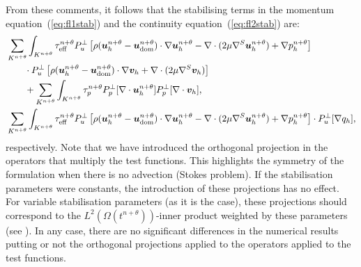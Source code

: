 \documentclass[11pt,a4paper,oneside,reqno]{amsart}
\newcommand{\Eq}[1]{(\ref{eq:#1})}
\def\u{{\bm u}}
\def\cl{\nonumber\\}
\def\vt{\bm v}
\begin{document}
From these comments, it follows that the stabilising terms in the momentum equation~\Eq{fl1stab} and the continuity equation~\Eq{fl2stab}  are:
\begin{align}
& \sum_{K^{n+\theta}}  \int_{K^{n+\theta}} 
 \tau^{n+\theta}_{\rm eff} P_u^\bot \left[
 \rho (\u_h^{n+\theta}-{\u_{\rm dom}^{n+\theta}})\cdot\nabla\u_h^{n+\theta}
- \nabla\cdot (2\mu \nabla^S\u_h^{n+\theta}) + \nabla p_h^{n+\theta}\right]\cl
& \qquad  \cdot P_u^\bot \left[
\rho (\u_h^{n+\theta}-{\u_{\rm dom}^{n+\theta}})\cdot\nabla\vt_h + \nabla\cdot (2\mu \nabla^S\vt_h)\right]\cl
& \qquad +  \sum_{K^{n+\theta}}  \int_{K^{n+\theta}}   \tau_p^{n+\theta} P_p^\bot[ \nabla \cdot \u_h^{n+\theta}] P_p^\bot[ \nabla \cdot \vt_h], \label{eq:stt1}\\
& \sum_{K^{n+\theta}}  \int_{K^{n+\theta}} 
 \tau_{\rm eff}^{n+\theta} P_u^\bot \left[
 \rho (\u_h^{n+\theta}-{\u_{\rm dom}^{n+\theta}})\cdot\nabla\u_h^{n+\theta}
- \nabla\cdot (2\mu \nabla^S\u_h^{n+\theta}) + \nabla p_h^{n+\theta}\right]\cdot P_u^\bot [ \nabla q_h],\label{eq:stt2}
\end{align}
respectively. Note that we have introduced the orthogonal projection in the operators that multiply the test functions. This highlights the symmetry of the formulation when there is no advection (Stokes problem). If the stabilisation parameters were constants, the introduction of these projections has no effect. For variable stabilisation parameters (as it is the case), these projections should correspond to the $L^2(\Omega(t^{n+\theta}))$-inner product weighted by these parameters (see \cite{codina10}). In any case, there are no significant differences in the numerical results putting or not the orthogonal projections applied to the operators applied to the test functions. 
\end{document}
